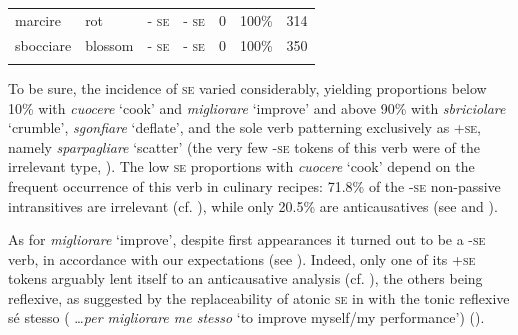 \documentclass[output=paper,colorlinks,citecolor=brown
]{langscibook}
\begin{document}
\begin{table}
{\begin{tabular}{|p{}|p{}||p{}|p{}||p{}|p{}||p{}|}
marcire      & rot       & - \textsc{se}                                                                                     & - \textsc{se}                                                                          & 0                                 & 100\%                                     & 314                 \\
sbocciare    & blossom   & - \textsc{se}                                                                                     & - \textsc{se}                                                                          & 0                                 & 100\%                                     & 350    \\   \lspbottomrule         
\end{tabular}}
\end{table}

To be sure, the incidence of \textsc{se} varied considerably, yielding proportions below 10\% with \textit{cuocere} ‘cook’ and \textit{migliorare} ‘improve’ and above 90\% with \textit{sbriciolare} ‘crumble’, \textit{sgonfiare} ‘deflate’, and the sole verb patterning exclusively as +\textsc{se}, namely \textit{sparpagliare} ‘scatter’ (the very few -\textsc{se} tokens of this verb were of the irrelevant type, ). The low \textsc{se} proportions with \textit{cuocere} ‘cook’ depend on the frequent occurrence of this verb in culinary recipes: 71.8\% of the -\textsc{se} non-passive intransitives are irrelevant (cf. ), while only 20.5\% are anticausatives (see  and ).

As for \textit{migliorare} ‘improve’, despite first appearances it turned out to be a -\textsc{se} verb, in accordance with our expectations (see ). Indeed, only one of its +\textsc{se} tokens arguably lent itself to an anticausative analysis (cf. ), the others being reflexive, as suggested by the replaceability of atonic \textsc{se} in  with the tonic reflexive sé stesso ( \ldots  \textit{per migliorare me stesso} ‘to improve myself/my performance’) ().
\end{document}
